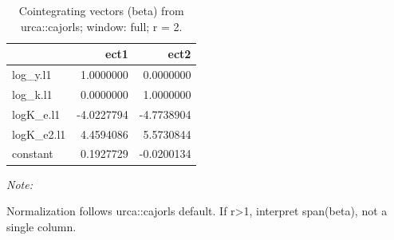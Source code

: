 \begin{table}[!h]
\centering
\caption{Cointegrating vectors (beta) from urca::cajorls; window: full; r = 2.}
\centering
\begin{threeparttable}
\begin{tabular}[t]{lrr}
\toprule
  & ect1 & ect2\\
\midrule
log\_y.l1 & 1.0000000 & 0.0000000\\
log\_k.l1 & 0.0000000 & 1.0000000\\
logK\_e.l1 & -4.0227794 & -4.7738904\\
logK\_e2.l1 & 4.4594086 & 5.5730844\\
constant & 0.1927729 & -0.0200134\\
\bottomrule
\end{tabular}
\begin{tablenotes}
\item \textit{Note: } 
\item Normalization follows urca::cajorls default. If r>1, interpret span(beta), not a single column.
\end{tablenotes}
\end{threeparttable}
\end{table}
